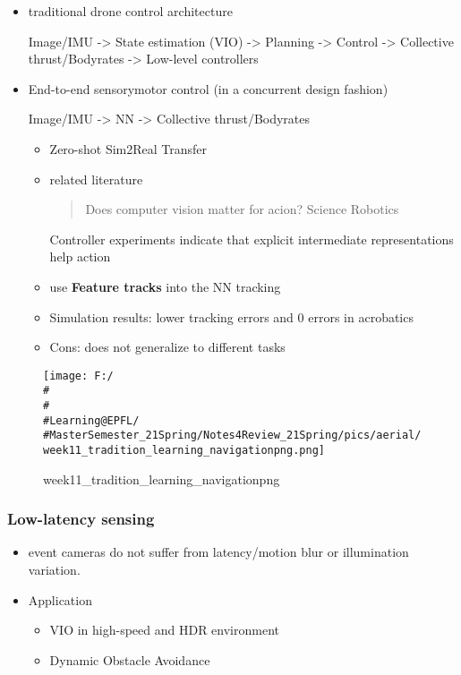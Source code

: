 \documentclass[]{article}
\begin{document}
\begin{itemize}
\item
  traditional drone control architecture

  Image/IMU -\textgreater{} State estimation (VIO) -\textgreater{}
  Planning -\textgreater{} Control -\textgreater{} Collective
  thrust/Bodyrates -\textgreater{} Low-level controllers
\item
  End-to-end sensorymotor control (in a concurrent design fashion)

  Image/IMU -\textgreater{} NN -\textgreater{} Collective
  thrust/Bodyrates

  \begin{itemize}
  \item
    Zero-shot Sim2Real Transfer
  \item
    related literature

    \begin{quote}
    Does computer vision matter for acion? Science Robotics
    \end{quote}

    Controller experiments indicate that explicit intermediate
    representations help action
  \item
    use \textbf{Feature tracks} into the NN tracking
  \item
    Simulation results: lower tracking errors and 0 errors in acrobatics
  \item
    Cons: does not generalize to different tasks
  \end{itemize}
\end{itemize}

\begin{figure}
\centering
\texttt{[image: F:/\\\#\\\#\\\#Learning@EPFL/\\\#MasterSemester\_21Spring/Notes4Review\_21Spring/pics/aerial/week11\_tradition\_learning\_navigationpng.png]}
\caption{week11\_tradition\_learning\_navigationpng}
\end{figure}

\subsubsection{Low-latency sensing}\label{header-n2711}

\begin{itemize}
\item
  event cameras do not suffer from latency/motion blur or illumination
  variation.
\item
  Application

  \begin{itemize}
  \item
    VIO in high-speed and HDR environment
  \item
    Dynamic Obstacle Avoidance
  \end{itemize}
\end{itemize}
\end{document}

